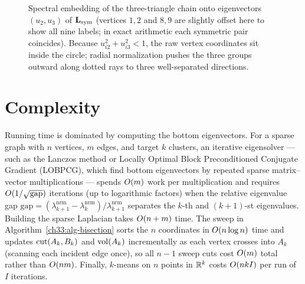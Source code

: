 \begin{figure}[htbp]
\caption{Spectral embedding of the three-triangle chain onto eigenvectors $(u_2, u_3)$ of $\mathbf{L}_{\mathrm{sym}}$ (vertices $1,2$ and $8,9$ are slightly offset here to show all nine labels; in exact arithmetic each symmetric pair coincides). Because $u_{i2}^2 + u_{i3}^2 < 1$, the raw vertex coordinates sit inside the circle; radial normalization pushes the three groups outward along dotted rays to three well-separated directions.}
\label{ch33:fig-blobs}
\end{figure}

\section{Complexity}
\label{ch33:complexity}

Running time is dominated by computing the bottom eigenvectors. For a sparse graph with $n$ vertices, $m$ edges, and target $k$ clusters,
an iterative eigensolver --- such as the Lanczos method or Locally Optimal Block Preconditioned Conjugate Gradient (LOBPCG), which find bottom eigenvectors by repeated sparse matrix--vector multiplications --- spends $O(m)$ work per multiplication and requires $O(1/\sqrt{\mathrm{gap}})$ iterations (up to logarithmic factors) when the relative eigenvalue gap $\mathrm{gap} = (\lambda_{k+1}^{\mathrm{nrm}} - \lambda_k^{\mathrm{nrm}})/\lambda_{k+1}^{\mathrm{nrm}}$ separates the $k$-th and $(k+1)$-st eigenvalues.
Building the sparse Laplacian takes $O(n + m)$ time. The sweep in Algorithm~\ref{ch33:alg-bisection} sorts the $n$ coordinates in $O(n\log n)$ time
and updates $\operatorname{cut}(A_k,B_k)$ and $\operatorname{vol}(A_k)$ incrementally as each vertex crosses into $A_k$ (scanning each incident edge once), so all $n-1$ sweep cuts cost
$O(m)$ total rather than $O(nm)$. Finally, $k$-means on $n$ points in $\mathbb{R}^k$ costs $O(nkI)$ per run
of $I$ iterations.

